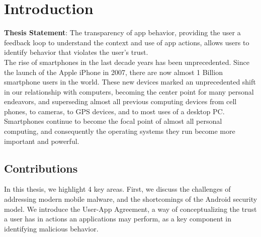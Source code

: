 \chapter{Introduction}
\label{sec:intro}

\textbf{Thesis Statement}: The transparency of app behavior, providing the user a feedback loop to understand the context and use of app actions, allows users to identify behavior that violates the user's trust.\\


The rise of smartphones in the last decade years has been unprecedented. Since the launch of the Apple iPhone in 2007, there are now almost 1 Billion smartphone users in the world\citep{kpcbinternetreport2012}. These new devices marked an unprecedented shift in our relationship with computers, becoming the center point for many personal endeavors, and superseding almost all previous computing devices from cell phones, to cameras, to GPS devices, and to most uses of a desktop PC\citep{hua2012introduction}. Smartphones continue to become the focal point of almost all personal computing, and consequently the operating systems they run become more important and powerful.

\section{Contributions}
In this thesis, we highlight 4 key areas. First, we discuss the challenges of addressing modern mobile malware, and the shortcomings of the Android security model. We introduce the User-App Agreement, a way of conceptualizing the trust a user has in actions an applications may perform, as a key component in identifying malicious behavior.


